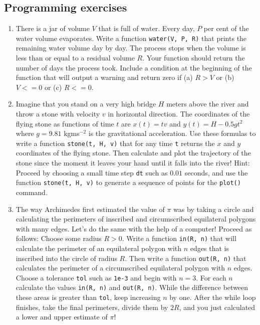 \subsection{Programming exercises}

\begin{enumerate}
\item There is a jar of volume $V$ that is full of water. Every day, 
$P$ per cent of the water volume evaporates. Write a function 
{\tt water(V, P, R)} that prints the remaining water volume day
by day. The process stops when the volume is less than or equal to 
a residual volume $R$. Your function should return the number of 
days the process took. Include a condition at the beginning 
of the function that will output a warning and return zero 
if (a) $R > V$ or (b) $V <= 0$ or (c) $R <= 0$.
\item Imagine that you stand on a very high bridge $H$ meters above 
the river and throw a stone with velocity $v$ in horizontal direction. 
The coordinates of the flying stone as functions of time $t$ are
$x(t) = t v$ and $y(t) = H - 0.5gt^2$ where $g = 9.81$ kgms$^{-2}$ is
the gravitational acceleration. Use these formulas to write a function 
{\tt stone(t, H, v)} that for any time {\tt t} returns the $x$ and 
$y$ coordinates of the flying stone. Then calculate and plot the trajectory 
of the stone since the moment it leaves your hand until it falls into the 
river! Hint: Proceed by choosing a small time step {\tt dt} such 
as $0.01$ seconds, and use the function {\tt stone(t, H, v)} to generate 
a sequence of points for the {\tt plot()} command.  
\item The way Archimedes first estimated the value of $\pi$ was 
by taking a circle and calculating the perimeters of inscribed and 
circumscribed equilateral polygons with many edges. Let's do the same 
with the help of a computer! Proceed as follows: Choose some radius 
$R > 0$. Write a function {\tt in(R, n)} that will calculate the perimeter 
of an equilateral polygon with $n$ edges that is inscribed into the
circle of radius $R$. Then write a function {\tt out(R, n)}
that calculates the perimeter of a circumscribed equilateral polygon 
with $n$ edges. Choose a tolerance {\tt tol} such as {\tt 1e-3} and 
begin with $n = 3$. For each $n$ calculate the values {\tt in(R, n)}
and {\tt out(R, n)}. While the difference between these areas is 
greater than {\tt tol}, keep increasing $n$ by one. After the while 
loop finishes, take the final perimeters, divide them by $2 R$, and 
you just calculated a lower and upper estimate of $\pi$! 
\end{enumerate}


